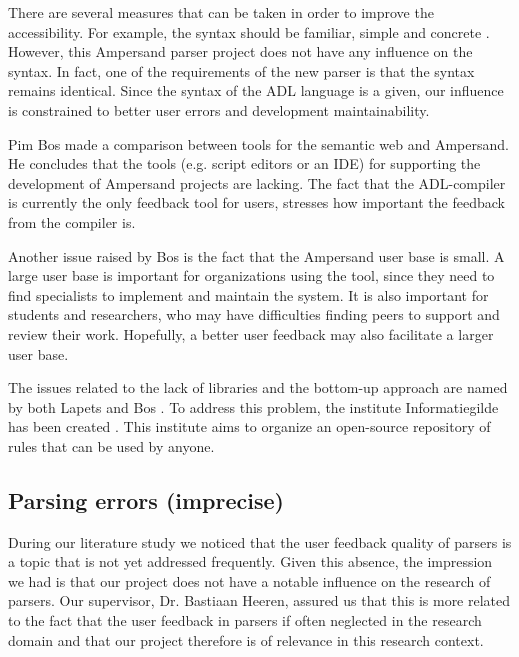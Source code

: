 There are several measures that can be taken in order to improve the accessibility.
For example, the syntax should be familiar, simple and concrete .
However, this Ampersand parser project does not have any influence on the syntax.
In fact, one of the requirements of the new parser is that the syntax remains identical.
Since the syntax of the ADL language is a given, our influence is constrained to better user errors and development maintainability.

Pim Bos  made a comparison between tools for the semantic web and Ampersand.
He concludes that the tools (e.g. script editors or an IDE) for supporting the development of Ampersand projects are lacking.
The fact that the ADL-compiler is currently the only feedback tool for users, stresses how important the feedback from the compiler is.

Another issue raised by Bos is the fact that the Ampersand user base is small.
A large user base is important for organizations using the tool, since they need to find specialists to implement and maintain the system.
It is also important for students and researchers, who may have difficulties finding peers to support and review their work.
Hopefully, a better user feedback may also facilitate a larger user base.

The issues related to the lack of libraries and the bottom-up approach are named by both Lapets  and Bos .
To address this problem, the institute Informatiegilde has been created .
This institute aims to organize an open-source repository of rules that can be used by anyone.

\subsection{Parsing errors (imprecise)}
During our literature study we noticed that the user feedback quality of parsers is a topic that is not yet addressed frequently.
Given this absence, the impression we had is that our project does not have a notable influence on the research of parsers.
Our supervisor, Dr. Bastiaan Heeren, assured us that this is more related to the fact that the user feedback in parsers if often neglected in the research domain and that our project therefore is of relevance in this research context.

